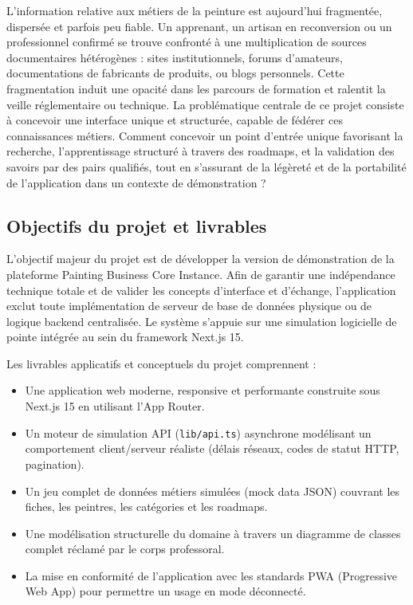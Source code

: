 \documentclass[12pt,a4paper]{report}
\begin{document}
L'information relative aux métiers de la peinture est aujourd'hui fragmentée, dispersée et parfois peu fiable. Un apprenant, un artisan en reconversion ou un professionnel confirmé se trouve confronté à une multiplication de sources documentaires hétérogènes : sites institutionnels, forums d'amateurs, documentations de fabricants de produits, ou blogs personnels. Cette fragmentation induit une opacité dans les parcours de formation et ralentit la veille réglementaire ou technique. La problématique centrale de ce projet consiste à concevoir une interface unique et structurée, capable de fédérer ces connaissances métiers. Comment concevoir un point d'entrée unique favorisant la recherche, l'apprentissage structuré à travers des roadmaps, et la validation des savoirs par des pairs qualifiés, tout en s'assurant de la légèreté et de la portabilité de l'application dans un contexte de démonstration ?

\subsection*{Objectifs du projet et livrables}

L'objectif majeur du projet est de développer la version de démonstration de la plateforme Painting Business Core Instance. Afin de garantir une indépendance technique totale et de valider les concepts d'interface et d'échange, l'application exclut toute implémentation de serveur de base de données physique ou de logique backend centralisée. Le système s'appuie sur une simulation logicielle de pointe intégrée au sein du framework Next.js 15.

Les livrables applicatifs et conceptuels du projet comprennent :
\begin{itemize}
    \item Une application web moderne, responsive et performante construite sous Next.js 15 en utilisant l'App Router.
    \item Un moteur de simulation API (\texttt{lib/api.ts}) asynchrone modélisant un comportement client/serveur réaliste (délais réseaux, codes de statut HTTP, pagination).
    \item Un jeu complet de données métiers simulées (mock data JSON) couvrant les fiches, les peintres, les catégories et les roadmaps.
    \item Une modélisation structurelle du domaine à travers un diagramme de classes complet réclamé par le corps professoral.
    \item La mise en conformité de l'application avec les standards PWA (Progressive Web App) pour permettre un usage en mode déconnecté.
\end{itemize}
\end{document}
